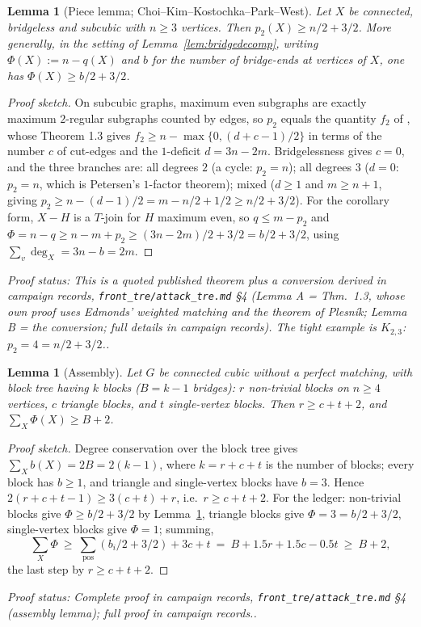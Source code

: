 \documentclass[a4paper,11pt]{amsart}
\newtheorem{lemma}[theorem]{Lemma}
\theoremstyle{definition}
\theoremstyle{remark}
\newcommand{\proofsrc}[1]{\par\smallskip\noindent\begin{sloppypar}\small\emph{Proof status: #1.}\end{sloppypar}\par\smallskip}
\begin{document}
\begin{lemma}[Piece lemma; Choi--Kim--Kostochka--Park--West]\label{lem:piece}
Let $X$ be connected, bridgeless and subcubic with $n\ge3$ vertices. Then $p_2(X)\ge n/2+3/2$. More
generally, in the setting of Lemma~\ref{lem:bridgedecomp}, writing $\Phi(X):=n-q(X)$ and $b$ for the
number of bridge-ends at vertices of $X$, one has $\Phi(X)\ge b/2+3/2$.
\end{lemma}
\begin{proof}[Proof sketch]
On subcubic graphs, maximum even subgraphs are exactly maximum $2$-regular subgraphs counted by edges, so
$p_2$ equals the quantity $f_2$ of \cite{CKKPW19}, whose Theorem 1.3 gives
$f_2\ge n-\max\{0,(d+c-1)/2\}$ in terms of the number $c$ of cut-edges and the $1$-deficit
$d=3n-2m$. Bridgelessness gives $c=0$, and the three branches are: all degrees $2$ (a cycle:
$p_2=n$); all degrees $3$ ($d=0$: $p_2=n$, which is Petersen's $1$-factor theorem); mixed
($d\ge1$ and $m\ge n+1$, giving $p_2\ge n-(d-1)/2=m-n/2+1/2\ge n/2+3/2$). For the corollary form,
$X-H$ is a $T$-join for $H$ maximum even, so $q\le m-p_2$ and
$\Phi=n-q\ge n-m+p_2\ge(3n-2m)/2+3/2=b/2+3/2$, using $\sum_v\deg_X=3n-b=2m$.
\end{proof}
\proofsrc{This is a quoted published theorem plus a conversion derived in campaign records,
\texttt{front\_tre/attack\_tre.md} \S4 (Lemma A = \cite{CKKPW19} Thm.~1.3, whose own proof uses Edmonds'
weighted matching and the theorem of Plesn\'ik; Lemma B = the conversion; full details in campaign
records). The tight example is $K_{2,3}$: $p_2=4=n/2+3/2$.}

\begin{lemma}[Assembly]\label{lem:assembly}
Let $G$ be connected cubic without a perfect matching, with block tree having $k$ blocks ($B=k-1$ bridges):
$r$ non-trivial blocks on $n\ge4$ vertices, $c$ triangle blocks, and $t$ single-vertex blocks. Then
$r\ge c+t+2$, and $\sum_X\Phi(X)\ge B+2$.
\end{lemma}
\begin{proof}[Proof sketch]
Degree conservation over the block tree gives $\sum_X b(X)=2B=2(k-1)$, where $k=r+c+t$ is the number of
blocks; every block has $b\ge1$, and triangle and single-vertex blocks have $b=3$. Hence
$2(r+c+t-1)\ge 3(c+t)+r$, i.e.\ $r\ge c+t+2$. For the ledger: non-trivial blocks give $\Phi\ge b/2+3/2$ by
Lemma~\ref{lem:piece}, triangle blocks give $\Phi=3=b/2+3/2$, single-vertex blocks give $\Phi=1$; summing,
\[
\textstyle\sum_X\Phi\ \ge\ \sum_{\mathrm{pos}}(b_i/2+3/2)+3c+t\ =\ B+1.5r+1.5c-0.5t\ \ge\ B+2,
\]
the last step by $r\ge c+t+2$.
\end{proof}
\proofsrc{Complete proof in campaign records, \texttt{front\_tre/attack\_tre.md} \S4 (assembly lemma); full
proof in campaign records.}
\end{document}
